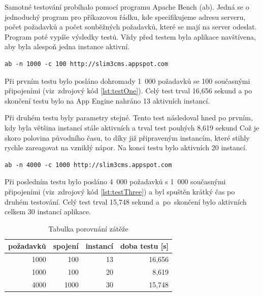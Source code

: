 Samotné testování probíhalo pomocí programu Apache Bench (ab). Jedná se o jednoduchý program pro příkazovou řádku, kde specifikujeme adresu serveru, počet požadavků a počet souběžných požadavků, které se mají na server odeslat. Program poté vypíše výsledky testů. Vždy před testem byla aplikace navštívena, aby byla alespoň jedna instance aktivní.

\lstset{language=bash}
\lstset{numbers=none}
\lstset{frame=none}
\begin{lstlisting}[caption={Testování 1000 požadavků se 100 souběžnými spojeními},label=lst:testOne,belowcaptionskip=0.4cm]
ab -n 1000 -c 100 http://slim3cms.appspot.com
\end{lstlisting}

Při prvním testu bylo posláno dohromady 1~000 požadavků se 100 současnými připojeními (viz~zdrojový kód \ref{lst:testOne}). Celý test trval 16,656 sekund a po skončení testu bylo na App Engine nahráno 13 aktivních instancí.

Při druhém testu byly parametry stejné. Tento test následoval hned po prvním, kdy byla většina instancí stále aktivních a trval test pouhých 8,619 sekund Což je skoro polovina původního času, to díky již připraveným instancím, které stihly rychle zareagovat na vzniklý nápor. Na konci testu bylo aktivních 20 instancí.

\begin{lstlisting}[caption={Testování 4000 požadavků s 1000 souběžnými spojeními},label=lst:testThree,belowcaptionskip=0.4cm]
ab -n 4000 -c 1000 http://slim3cms.appspot.com
\end{lstlisting}

Při posledním testu bylo posláno 4~000 požadavků s 1~000 současnými připojeními (viz~zdrojový kód \ref{lst:testThree}) a byl spuštěn krátký čas po druhém testování. Celý test trval 15,748 sekund a~po~skončení bylo aktivních celkem 30 instancí aplikace.

\begin{table}[h]
\centering
\caption{Tabulka porovnání zátěže}\label{tab:requestTest}
\begin{tabular}{|r|r|r|r|}
   \hline
požadavků	& spojení	& instancí	& doba testu [s]	\\
   \hline
1000			& 100	& 13		& 16,656	\\
1000			& 100	& 20		& 8,619 	\\
4000			& 1000	& 30		& 15,748	 \\
   \hline
\end{tabular}
\end{table}

